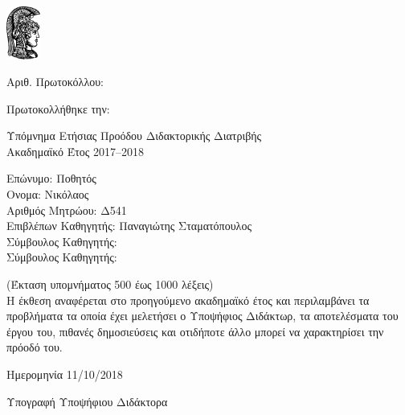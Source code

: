 \documentclass[a4paper]{article}
\begin{document}

\includegraphics[width=3em]{athena}

Αριθ. Πρωτοκόλλου:

Πρωτοκολλήθηκε την:

Υπόμνημα Ετήσιας Προόδου Διδακτορικής Διατριβής \\
Ακαδημαϊκό Έτος 2017–2018

Επώνυμο: Ποθητός \\
Ονομα: Νικόλαος \\
Αριθμός Μητρώου: Δ541 \\
Επιβλέπων Καθηγητής: Παναγιώτης Σταματόπουλος \\
Σύμβουλος Καθηγητής: \\
Σύμβουλος Καθηγητής:

(Έκταση υπομνήματος 500 έως 1000 λέξεις) \\
Η έκθεση αναφέρεται στο προηγούμενο ακαδημαϊκό έτος και περιλαμβάνει τα προβλήματα τα οποία έχει μελετήσει ο Υποψήφιος Διδάκτωρ, τα αποτελέσματα του έργου του, πιθανές δημοσιεύσεις και οτιδήποτε άλλο μπορεί να χαρακτηρίσει την πρόοδό του.

Ημερομηνία 11/10/2018

Υπογραφή Υποψήφιου Διδάκτορα
\end{document}
